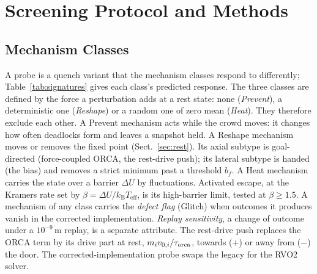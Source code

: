 \section{Screening Protocol and Methods}\label{sec:signatures}

%
\subsection{Mechanism Classes}
A probe is a quench variant that the mechanism classes respond to differently; Table~\ref{tab:signatures} gives each class's predicted response. The three classes are defined by the force a perturbation adds at a rest state: none (\emph{Prevent}), a deterministic one (\emph{Reshape}) or a random one of zero mean (\emph{Heat}). They therefore exclude each other. A Prevent mechanism acts while the crowd moves: it changes how often deadlocks form and leaves a snapshot held. A Reshape mechanism moves or removes the fixed point (Sect.~\ref{sec:rest}). Its axial subtype is goal-directed (force-coupled ORCA, the rest-drive push); its lateral subtype is handed (the bias) and removes a strict minimum past a threshold $b_f$. A Heat mechanism carries the state over a barrier $\Delta U$ by fluctuations. Activated escape, at the Kramers rate set by $\beta=\Delta U/k_{\mathrm{B}}T_{\mathrm{eff}}$, is its high-barrier limit, tested at $\beta\ge1.5$. A mechanism of any class carries the \emph{defect flag} (Glitch) when outcomes it produces vanish in the corrected implementation. \emph{Replay sensitivity}, a change of outcome under a $10^{-9}$\,m replay, is a separate attribute. The rest-drive push replaces the ORCA term by its drive part at rest, $m_iv_{0,i}/\tau_{\rm orca}$, towards ($+$) or away from ($-$) the door. The corrected-implementation probe swaps the legacy for the RVO2 solver.

